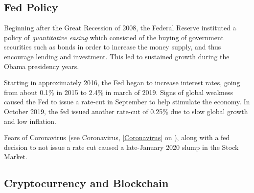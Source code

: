 		\subsection{Fed Policy}
		
		Beginning after the Great Recession of 2008, the Federal Reserve instituted a policy of \textit{quantitative easing} which consisted of the buying of government securities such as bonds in order to increase the money supply, and thus encourage lending and investment.  This led to sustained growth during the Obama presidency years.  
		
		Starting in approximately 2016, the Fed began to increase interest rates, going from about 0.1\% in 2015 to 2.4\% in march of 2019.  Signs of global weakness caused the Fed to issue a rate-cut in September to help stimulate the economy.  In October 2019, the fed issued another rate-cut of 0.25\% due to slow global growth and low inflation.  
		
		
		Fears of Coronavirus (see Coronavirus, \ref{Coronavirus} on ), along with a fed decision to not issue a rate cut caused a late-January 2020 slump in the Stock Market.  
		
		
		
		
		\subsection{Cryptocurrency and Blockchain}
		\def\bitcoinA{%
			\leavevmode
			\vtop{\offinterlineskip %
				\setbox0=\hbox{B}%
				\setbox2=\hbox to\wd0{\hfil\hskip-.03em
					\vrule height .3ex width .15ex\hskip .08em
					\vrule height .3ex width .15ex\hfil}
				\vbox{\copy2\box0}\box2}}
		
